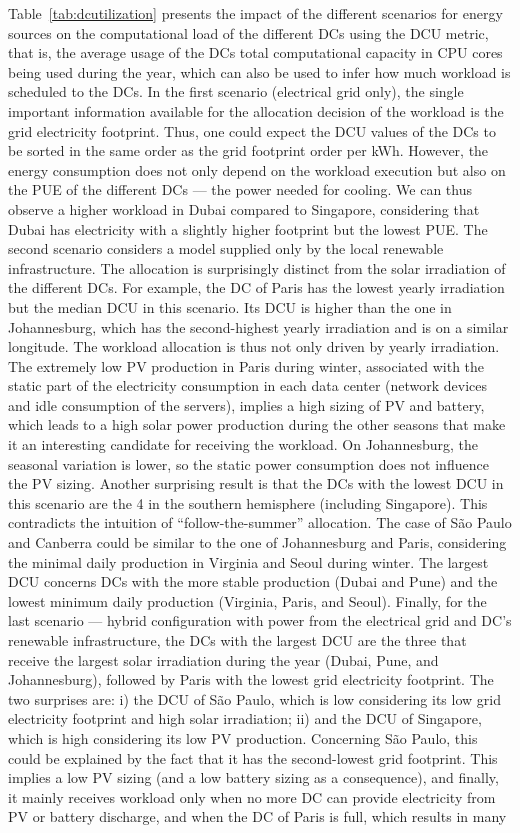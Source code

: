 Table~\ref{tab:dcutilization} presents the impact of the different scenarios for energy sources on the computational load of the different DCs using the DCU metric, that is, the average usage of the DCs total computational capacity in CPU cores being used during the year, which can also be used to infer how much workload is scheduled to the DCs. In the first scenario (electrical grid only), the single important information available for the allocation decision of the workload is the grid electricity footprint. Thus, one could expect the DCU values of the DCs to be sorted in the same order as the grid footprint order per kWh. However, the energy consumption does not only depend on the workload execution but also on the PUE of the different DCs --- the power needed for cooling. We can thus observe a higher workload in Dubai compared to Singapore, considering that Dubai has electricity with a slightly higher footprint but the lowest PUE. The second scenario considers a model supplied only by the local renewable infrastructure. The allocation is surprisingly distinct from the solar irradiation of the different DCs. For example, the DC of Paris has the lowest yearly irradiation but the median DCU in this scenario. Its DCU is higher than the one in Johannesburg, which has the second-highest yearly irradiation and is on a similar longitude. The workload allocation is thus not only driven by yearly irradiation. The extremely low PV production in Paris during winter, associated with the static part of the electricity consumption in each data center (network devices and idle consumption of the servers), implies a high sizing of PV and battery, which leads to a high solar power production during the other seasons that make it an interesting candidate for receiving the workload. On Johannesburg, the seasonal variation is lower, so the static power consumption does not influence the PV sizing. Another surprising result is that the DCs with the lowest DCU in this scenario are the 4 in the southern hemisphere (including Singapore). This contradicts the intuition of ``follow-the-summer'' allocation. The case of S\~ao Paulo and Canberra could be similar to the one of Johannesburg and Paris, considering the minimal daily production in Virginia and Seoul during winter. The largest DCU concerns DCs with the more stable production (Dubai and Pune) and the lowest minimum daily production (Virginia, Paris, and Seoul). Finally, for the last scenario --- hybrid configuration with power from the electrical grid and DC's renewable infrastructure, the DCs with the largest DCU are the three that receive the largest solar irradiation during the year (Dubai, Pune, and Johannesburg), followed by Paris with the lowest grid electricity footprint. The two surprises are: i) the DCU of S\~ao Paulo, which is low considering its low grid electricity footprint and high solar irradiation; ii) and the DCU of Singapore, which is high considering its low PV production. Concerning S\~ao Paulo, this could be explained by the fact that it has the second-lowest grid footprint. This implies a low PV sizing (and a low battery sizing as a consequence), and finally, it mainly receives workload only when no more DC can provide electricity from PV or battery discharge, and when the DC of Paris is full, which results in many 